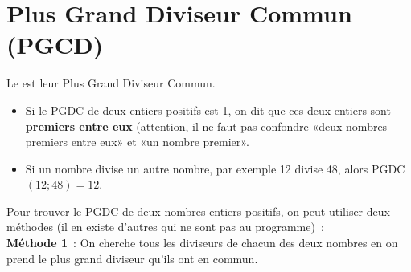  \section{Plus Grand Diviseur Commun (PGCD)}
 
 \begin{definition}
Le  est leur Plus Grand Diviseur Commun.
\begin{itemize}
 \item Si le PGDC de deux entiers positifs est 1, on dit que ces deux entiers sont \textbf{premiers entre eux} (attention, il ne faut pas confondre «deux nombres premiers entre eux» et «un nombre premier».
 \item Si un nombre divise un autre nombre, par exemple 12 divise 48, alors PGDC $(12 ; 48) = 12$.
 \end{itemize}
\end{definition}
 
 \vspace{4em}
 
 Pour trouver le PGDC de deux nombres entiers positifs, on peut utiliser deux méthodes (il en existe d'autres qui ne sont pas au programme) : \\[1em]
\textcolor{H1}{\textbf{Méthode 1}} : On cherche tous les diviseurs de chacun des deux nombres en on prend le plus grand diviseur qu'ils ont en commun.



